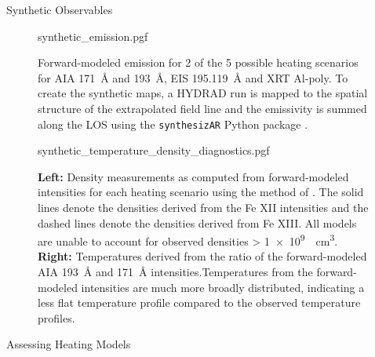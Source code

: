 \documentclass[final]{beamer}
\newlength{\colwidth}
\begin{document}
\begin{frame}[t]
\begin{columns}[t]
\begin{column}{\colwidth}
  \begin{block}{Synthetic Observables}

    \begin{figure}
      \centering
      {synthetic_emission.pgf}
      \label{fig:synthetic_emission}
      \caption{Forward-modeled emission for 2 of the 5 possible heating scenarios for AIA \SI{171}{\angstrom} and \SI{193}{\angstrom}, EIS \SI{195.119}{\angstrom} and XRT Al-poly. To create the synthetic maps, a HYDRAD run is mapped to the spatial structure of the extrapolated field line and the emissivity is summed along the LOS using the \texttt{synthesizAR} Python package \citep{barnes_understanding_2019}.}
    \end{figure}

    \vspace{-50pt}

    \begin{figure}
      \centering
      {synthetic_temperature_density_diagnostics.pgf}
      \label{fig:synethetic_diagnostics}
      \caption{\textbf{Left:} Density measurements as computed from forward-modeled intensities for each heating scenario using the method of \citet{young_high-precision_2009}. The solid lines denote the densities derived from the Fe XII intensities and the dashed lines denote the densities derived from Fe XIII. \alert{All models are unable to account for observed densities > \SI{1e9}{\per\cubic\cm}}. \textbf{Right:} Temperatures derived from the ratio of the forward-modeled AIA \SI{193}{\angstrom} and \SI{171}{\angstrom} intensities.\alert{Temperatures from the forward-modeled intensities are much more broadly distributed, indicating a less flat temperature profile compared to the observed temperature profiles.}}
    \end{figure}

  \end{block}

  \vspace{-10pt}

  \begin{block}{Assessing Heating Models}


\end{block}
\end{column}
\end{columns}
\end{frame}
\end{document}
